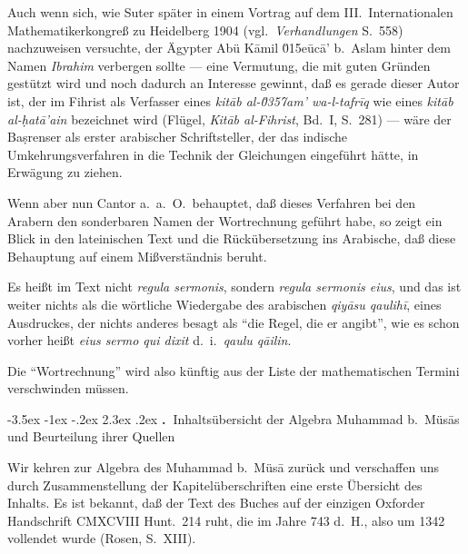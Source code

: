 \documentclass[11pt,a4paper]{article}
\makeatletter
\renewcommand{\section}{\@startsection{section}{1}{\z@}%
  {-3.5ex \@plus -1ex \@minus -.2ex}%
  {2.3ex \@plus .2ex}%
  {\normalfont\Large\bfseries\color{sectioncolor}\thesection.\ }}
\newcommand{\enquote}[1]{``#1''}
\makeatother
\begin{document}
Auch wenn sich, wie Suter sp\"ater in einem Vortrag auf dem III.\ Internationalen Mathematikerkongre\ss{} zu Heidelberg 1904 (vgl.\ \textit{Verhandlungen} S.\ 558) nachzuweisen versuchte, der \"Agypter Ab\"u K\=amil \u015e\=uc\=a' b.\ Aslam hinter dem Namen \textit{Ibrahim} verbergen sollte --- eine Vermutung, die mit guten Gr\"unden gest\"utzt wird und noch dadurch an Interesse gewinnt, da\ss{} es gerade dieser Autor ist, der im Fihrist als Verfasser eines \textit{kit\=ab al-\u0357{}am' wa-l-tafr\={i}q} wie eines \textit{kit\=ab al-\d{h}at\=a'ain} bezeichnet wird (Fl\"ugel, \textit{Kit\=ab al-Fihrist}, Bd.\ I, S.\ 281) --- w\"are der Ba\d{s}renser als erster arabischer Schriftsteller, der das indische Umkehrungsverfahren in die Technik der Gleichungen eingef\"uhrt h\"atte, in Erw\"agung zu ziehen.

Wenn aber nun Cantor a.\ a.\ O.\ behauptet, da\ss{} dieses Verfahren bei den Arabern den sonderbaren Namen der Wortrechnung gef\"uhrt habe, so zeigt ein Blick in den lateinischen Text und die R\"uck\"ubersetzung ins Arabische, da\ss{} diese Behauptung auf einem Mi\ss{}verst\"andnis beruht.

Es hei\ss{}t im Text nicht \textit{regula sermonis}, sondern \textit{regula sermonis eius}, und das ist weiter nichts als die w\"ortliche Wiedergabe des arabischen \textit{qiy\=asu qaulih\={i}}, eines Ausdruckes, der nichts anderes besagt als \enquote{die Regel, die er angibt}, wie es schon vorher hei\ss{}t \textit{eius sermo qui dixit} d.\ i.\ \textit{qaulu q\=ailin}.

Die \enquote{Wortrechnung} wird also k\"unftig aus der Liste der mathematischen Termini verschwinden m\"ussen.

\clearpage

\section{Inhalts\"ubersicht der Algebra Muhammad b.\ M\"us\=as und Beurteilung ihrer Quellen}

Wir kehren zur Algebra des Muhammad b.\ M\"us\=a zur\"uck und verschaffen uns durch Zusammenstellung der Kapitel\"uberschriften eine erste \"Ubersicht des Inhalts. Es ist bekannt, da\ss{} der Text des Buches auf der einzigen Oxforder Handschrift CMXCVIII Hunt.\ 214 ruht, die im Jahre 743 d.\ H., also um 1342 vollendet wurde (Rosen, S.\ XIII).
\end{document}
